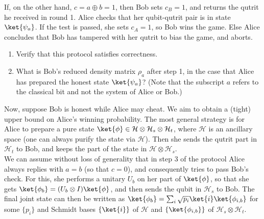 \begin{exercises}
\begin{protocolEnumerate}
\item If, on the other hand, $c = a \oplus b = 1$, then Bob sets $c_B = 1$, and returns the qutrit he received in round 1. Alice checks that her qubit-qutrit pair is in state $\ket{\psi_{a}}$. If the test is passed, she sets $c_A = 1$, so Bob wins the game. Else Alice concludes that Bob has tampered with her qutrit to bias the game, and aborts.
\end{protocolEnumerate}
\begin{enumerate}
\item Verify that this protocol satisfies correctness. 
\item What is Bob's reduced density matrix $\rho_a$ after step 1, in the case that Alice has prepared the honest state $\ket{\psi_{a}}$? (Note that the subscript $a$ refers to the classical bit and not the system of Alice or Bob.)
\end{enumerate}
Now, suppose Bob is honest while Alice may cheat. We aim to obtain a (tight) upper bound on Alice's winning probability. 
The most general strategy is for Alice to prepare a pure state $\ket{\phi} \in \mathcal{H} \otimes \mathcal{H}_s \otimes \mathcal{H}_t$, where $\mathcal{H}$ is an ancillary space (one can always purify the state via $\mathcal{H}$). Then she sends the qutrit part in $\mathcal{H}_t$ to Bob, and keeps the part of the state in $\mathcal{H} \otimes \mathcal{H}_s$. \\
We can assume without loss of generality that in step 3 of the protocol Alice always replies with $a=b$ (so that $c=0$), and consequently tries to pass Bob's check. For this, she performs a unitary $U_b$ on her part of $\ket{\phi}$, so that she gets $\ket{\phi_b} = (U_b \otimes I) \ket{\phi}$, and then sends the qubit in $\mathcal{H}_s$ to Bob. The final joint state can then be written as $\ket{\phi_b} = \sum_i \sqrt{p_i}\ket{i}  \ket{\phi_{i,b}} $ for some $\{p_i\}$ and Schmidt bases $\{\ket{i}\}$ of $\mathcal{H}$ and $\{\ket{\phi_{i,b}}\}$ of $ \mathcal{H}_s \otimes \mathcal{H}_t$. 


\end{exercises}
